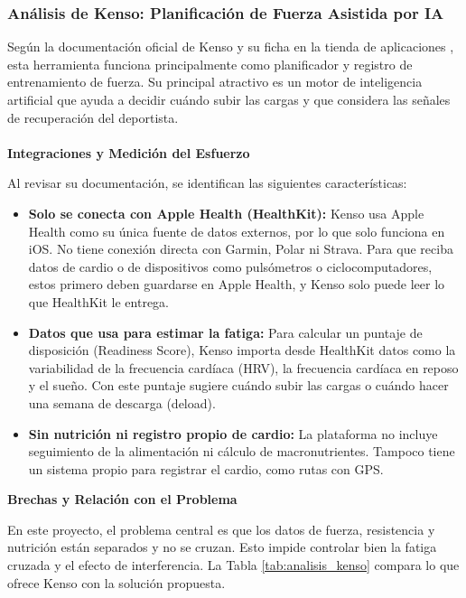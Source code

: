 \subsubsection{Análisis de Kenso: Planificación de Fuerza Asistida por IA}
Según la documentación oficial de Kenso y su ficha en la tienda de aplicaciones \citep{kenso_official, kenso_appstore}, esta herramienta funciona principalmente como planificador y registro de entrenamiento de fuerza. Su principal atractivo es un motor de inteligencia artificial que ayuda a decidir cuándo subir las cargas y que considera las señales de recuperación del deportista.
\\\\
\textbf{Integraciones y Medición del Esfuerzo}

Al revisar su documentación, se identifican las siguientes características:

\begin{itemize}
    \item \textbf{Solo se conecta con Apple Health (HealthKit):} Kenso usa Apple Health como su única fuente de datos externos, por lo que solo funciona en iOS. No tiene conexión directa con Garmin, Polar ni Strava. Para que reciba datos de cardio o de dispositivos como pulsómetros o ciclocomputadores, estos primero deben guardarse en Apple Health, y Kenso solo puede leer lo que HealthKit le entrega.
    \item \textbf{Datos que usa para estimar la fatiga:} Para calcular un puntaje de disposición (Readiness Score), Kenso importa desde HealthKit datos como la variabilidad de la frecuencia cardíaca (HRV), la frecuencia cardíaca en reposo y el sueño. Con este puntaje sugiere cuándo subir las cargas o cuándo hacer una semana de descarga (deload).
    \item \textbf{Sin nutrición ni registro propio de cardio:} La plataforma no incluye seguimiento de la alimentación ni cálculo de macronutrientes. Tampoco tiene un sistema propio para registrar el cardio, como rutas con GPS.
\end{itemize}
\newpage
\textbf{Brechas y Relación con el Problema}

En este proyecto, el problema central es que los datos de fuerza, resistencia y nutrición están separados y no se cruzan. Esto impide controlar bien la fatiga cruzada y el efecto de interferencia. La Tabla \ref{tab:analisis_kenso} compara lo que ofrece Kenso con la solución propuesta.

